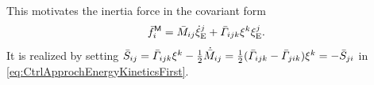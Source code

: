 This motivates the inertia force in the covariant form
\begin{align}
 \bar{f}^{\mathsf{M}}_{i} = \bar{M}_{ij} \dot{\xi}^{j}_{\mathrm{E}} + \bar{\varGamma}_{ijk}\xi^{k} \xi^{j}_{\mathrm{E}}.
\end{align}
It is realized by setting $\bar{S}_{ij} = \bar{\varGamma}_{ijk}\xi^{k} - \tfrac{1}{2}\dot{\bar{M}}_{ij} = \tfrac{1}{2}(\bar{\varGamma}_{ijk} - \bar{\varGamma}_{jik})\xi^{k} = -\bar{S}_{ji}$ in \eqref{eq:CtrlApprochEnergyKineticsFirst}.



